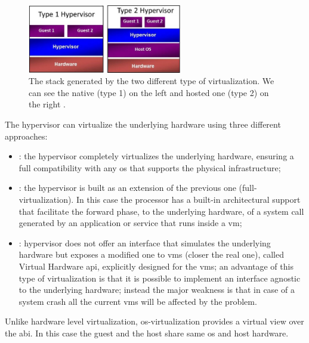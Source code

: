 \begin{figure}
	\centering{}
	\includegraphics[width=0.6\textwidth]{chapters/background/images/virtualization-types.png}
	\caption[Virtualization types]{The stack generated by the two different type of virtualization.
		We can see the native (type 1) on the left and hosted one (type 2) on the right
		\cite{virtualizationTypes}.}
	\label{img:background-paas-virtualization-assets-virtualizationTypes}
\end{figure}

The hypervisor can virtualize the underlying hardware using three different approaches:

\begin{itemize}
	\item{: the hypervisor completely virtualizes the underlying hardware,
		ensuring a full compatibility with any \acs{os} that supports the physical infrastructure;}
	\item{: the hypervisor is built as an extension of the
		previous one (full-virtualization). In this case the processor has a built-in architectural support
		that facilitate the forward phase, to the underlying hardware, of a system call generated by an
		application or service that runs inside a \ac{vm};}
	\item{: hypervisor does not offer an interface that simulates the
		underlying hardware but exposes a modified one to \ac{vm}s (closer the real one), called Virtual
		Hardware \acs{api}, explicitly designed for the \ac{vm}s; an advantage of this type of virtualization
		is that it is possible to implement an interface agnostic to the underlying hardware; instead
		the major weakness is that in case of a system crash all the current \ac{vm}s will be affected by
		the problem.}
\end{itemize}

Unlike hardware level virtualization, \acs{os}-virtualization  provides a virtual view over the
\ac{abi}. In this case the guest and the host share same \acs{os} and host hardware.

